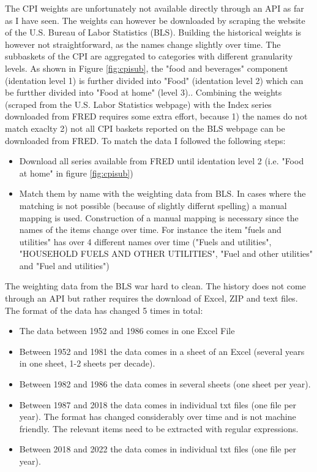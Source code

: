 \documentclass[12pt]{article}
\begin{document}
The CPI weights are unfortunately not available directly through an API as far as I have seen. The weights can however be downloaded by scraping the website of the U.S. Bureau of Labor Statistics (BLS). Building the historical weights is however not straightforward, as the names change slightly over time. 
The subbaskets of the CPI are aggregated to categories with different granularity levels. As shown in Figure \ref{fig:cpisub}, the "food and beverages" component (identation level 1) is further divided into "Food" (identation level 2) which can be furtther divided into "Food at home" (level 3)..
Combining the weights (scraped from the U.S. Labor Statistics webpage) with the Index series downloaded from FRED requires some extra effort, because 1) the names do not match exaclty  2) not all CPI baskets reported on the BLS webpage can be downloaded from FRED. 
To match the data I followed the following steps:
\begin{itemize}
\item Download all series available from FRED until identation level 2 (i.e. "Food at home" in figure \ref{fig:cpisub})
\item Match them by name with the weighting data from BLS. In cases where the matching is not possible (because of slightly differnt spelling) a manual mapping is used. Construction of a manual mapping is necessary since the names of the items change over time. 
For instance the item "fuels and utilities" has over 4 different names over time ("Fuels and utilities", "HOUSEHOLD FUELS AND OTHER UTILITIES", "Fuel and other utilities" and "Fuel and utilities")
\end{itemize}
The weighting data from the BLS war hard to clean. The history does not come through an API but rather requires the download of Excel, ZIP and text files. The format of the data has changed 5 times in total:
\begin{itemize}
\item The data between 1952 and 1986 comes in one Excel File
\item Between 1952 and 1981 the data comes  in a sheet of an Excel (several years in one sheet, 1-2 sheets per decade).
\item Between 1982 and 1986 the data comes in several sheets (one sheet per year).
\item Between 1987 and 2018  the data comes in individual txt files (one file per year). The format has changed considerably over time and is not machine friendly. The relevant items need to be extracted with regular expressions.
\item Between 2018 and 2022 the data comes in individual txt files (one file per year). 
\end{itemize}
\end{document}
